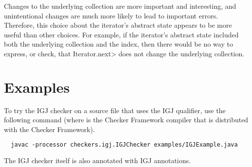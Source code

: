 Changes to the underlying collection are more important and interesting,
and unintentional changes are much more likely to lead to important
errors.  Therefore, this choice about the iterator's abstract state
appears to be more useful than other choices.  For example, if the
iterator's abstract state included both the underlying collection and
the index, then there would be no way to express, or check, that
\<Iterator.next> does not change the underlying collection.


\section{Examples\label{igj-example}}

To try the IGJ checker on a source file that uses the IGJ qualifier, use
the following command (where  is the Checker Framework compiler that
is distributed with the Checker Framework).

\begin{Verbatim}
  javac -processor checkers.igj.IGJChecker examples/IGJExample.java
\end{Verbatim}

The IGJ checker itself is also annotated with IGJ annotations.


